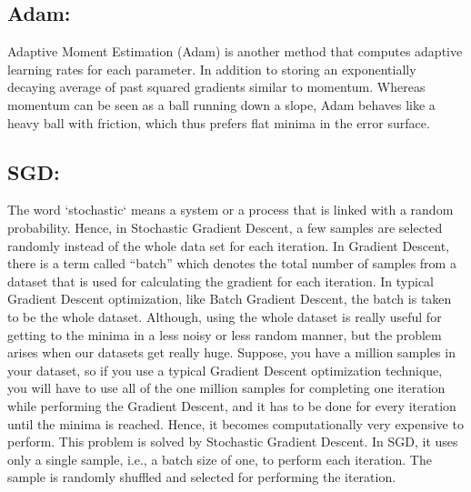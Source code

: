 \documentclass{report}
\begin{document}
\paragraph{}

\subsection{Adam: }
Adaptive Moment Estimation (Adam) is another method that computes adaptive learning rates for each parameter. In addition to storing an exponentially decaying average of past squared gradients similar to momentum. Whereas momentum can be seen as a ball running down a slope, Adam behaves like a heavy ball with friction, which thus prefers flat minima in the error surface.
\paragraph{}

\subsection{SGD: }
The word ‘stochastic‘ means a system or a process that is linked with a random probability. Hence, in Stochastic Gradient Descent, a few samples are selected randomly instead of the whole data set for each iteration. In Gradient Descent, there is a term called “batch” which denotes the total number of samples from a dataset that is used for calculating the gradient for each iteration. In typical Gradient Descent optimization, like Batch Gradient Descent, the batch is taken to be the whole dataset. Although, using the whole dataset is really useful for getting to the minima in a less noisy or less random manner, but the problem arises when our datasets get really huge.
Suppose, you have a million samples in your dataset, so if you use a typical Gradient Descent optimization technique, you will have to use all of the one million samples for completing one iteration while performing the Gradient Descent, and it has to be done for every iteration until the minima is reached. Hence, it becomes computationally very expensive to perform.
This problem is solved by Stochastic Gradient Descent. In SGD, it uses only a single sample, i.e., a batch size of one, to perform each iteration. The sample is randomly shuffled and selected for performing the iteration.

\paragraph{}
\end{document}
